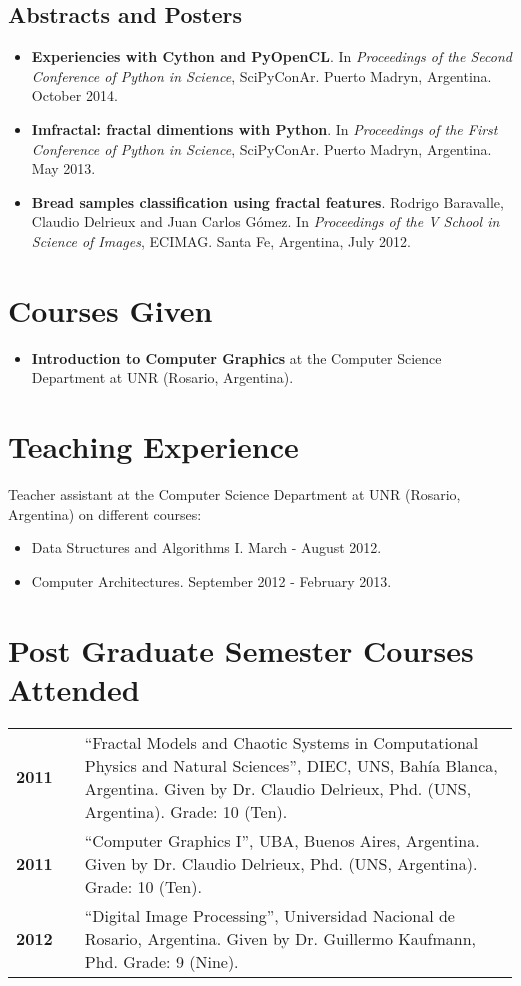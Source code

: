 \documentclass[a4paper,12pt]{article}
\begin{document}
\subsection*{Abstracts and Posters}
\begin{itemize}
\item {\bf Experiencies with Cython and PyOpenCL}. In {\it Proceedings of the Second Conference of Python in Science}, SciPyConAr. Puerto Madryn, Argentina. October 2014.
\item {\bf Imfractal: fractal dimentions with Python}.  In {\it Proceedings of the First Conference of Python in Science}, SciPyConAr. Puerto Madryn, Argentina. May 2013.
\item {\bf Bread samples classification using fractal features}. Rodrigo Baravalle, Claudio Delrieux and Juan Carlos G\'omez. In {\it Proceedings of the V School in Science of Images}, ECIMAG. Santa Fe, Argentina, July 2012.
\end{itemize}


\section*{Courses Given}
\begin{itemize}
\item {\bf Introduction to Computer Graphics} at the Computer Science Department at UNR (Rosario, Argentina).
\end{itemize}

\section*{Teaching Experience}

Teacher assistant at the Computer Science Department at UNR (Rosario, Argentina) on different courses:
\begin{itemize}
\item Data Structures and Algorithms I. March - August 2012.
\item Computer Architectures. September 2012 - February 2013.
\end{itemize}


\section*{Post Graduate Semester Courses Attended}

\begin{tabular}{lcp{12 cm}}
\bf{2011}& & \textquotedblleft Fractal Models and Chaotic Systems in Computational Physics and Natural Sciences\textquotedblright, DIEC, UNS, Bah\'ia Blanca, Argentina. Given by Dr. Claudio Delrieux, Phd. (UNS, Argentina). Grade: 10 (Ten).\\
\bf{2011}& & \textquotedblleft Computer Graphics I\textquotedblright, UBA, Buenos Aires, Argentina. Given by Dr. Claudio Delrieux, Phd. (UNS, Argentina). Grade: 10 (Ten).\\
\bf{2012}& & \textquotedblleft Digital Image Processing\textquotedblright, Universidad Nacional de Rosario, Argentina. Given by Dr. Guillermo Kaufmann, Phd. Grade: 9 (Nine).\\
\end{tabular}
\end{document}
